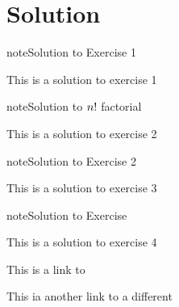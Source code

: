\chapter{Solution}
\label{\detokenize{solution:solution}}\label{\detokenize{solution::doc}} \label{solution:solution-1}
\begin{sphinxadmonition}{note}{Solution to  Exercise 1}



\sphinxAtStartPar
This is a solution to exercise 1
\end{sphinxadmonition}
 \label{solution:solution-2}
\begin{sphinxadmonition}{note}{Solution to \protect\(n!\protect\) factorial}



\sphinxAtStartPar
This is a solution to exercise 2
\end{sphinxadmonition}
 \label{solution:solution-3}
\begin{sphinxadmonition}{note}{Solution to  Exercise 2}



\sphinxAtStartPar
This is a solution to exercise 3
\end{sphinxadmonition}
 \label{solution:solution-4}
\begin{sphinxadmonition}{note}{Solution to Exercise }



\sphinxAtStartPar
This is a solution to exercise 4
\end{sphinxadmonition}

\sphinxAtStartPar
This is a link to {\hyperref[\detokenize{solution:solution-1}]{}}

\sphinxAtStartPar
This ia another link to a different {\hyperref[\detokenize{solution:solution-3}]{}}



\renewcommand{\indexname}{Index}
\printindex

